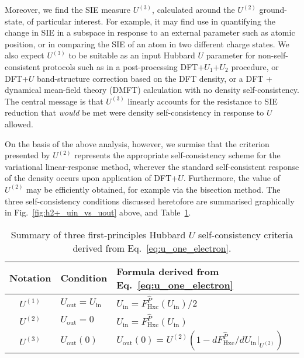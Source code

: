 Moreover, 
we find the SIE measure $U^{(3)}$, 
calculated around the $U^{(2)}$ ground-state, 
of particular interest.
%
For example, 
it may find use in quantifying the change in SIE 
in a subspace in response to an
external parameter such as atomic position, 
or in comparing the SIE of an atom in two different charge states.
%
We also expect $U^{(3)}$ to be suitable as
an input Hubbard $U$ parameter
for non-self-consistent protocols such as 
in a post-processing 
DFT+$U_1$+$U_2$ procedure, 
or DFT+$U$ band-structure correction based on the DFT density, 
or a DFT + dynamical mean-field theory (DMFT) calculation
with no density self-consistency. 
%
The central message is that 
$U^{(3)}$ linearly accounts
for the resistance to SIE reduction that {\it would} be met
were density self-consistency in response to $U$ allowed.

On the basis of the above analysis, however, 
we surmise that the criterion presented by $U^{(2)}$ 
represents the appropriate self-consistency scheme 
for the variational linear-response method, 
wherever the standard self-consistent response of the
density occurs upon application of DFT+$U$.
%
Furthermore, 
the value of $U^{(2)}$ may be efficiently obtained, 
for example via the bisection method.
%
The three self-consistency conditions 
discussed heretofore are summarised 
graphically in 
Fig.~\ref{fig:h2+_uin_vs_uout} above,  and 
Table~\ref{table:self_consistent_conditions}.

\begin{table}[th!]
\begin{tabular*}{\columnwidth}{@{\extracolsep{\fill}}cll}
\hline\hline
Notation & 	Condition 		& Formula derived from Eq.~\ref{eq:u_one_electron}\\
\hline
$U^{(1)}$	&\;$U_\textrm{out}=U_\textrm{in}$ & \;$U_\textrm{in}= F^{\hat{P}}_\textrm{Hxc}(U_\textrm{in})/2$\\[0.5em]
$U^{(2)}$	&\;$U_\textrm{out}=0$	& \;$U_\textrm{in}= F^{\hat{P}}_\textrm{Hxc}(U_\textrm{in})$\\[0.5em]
$U^{(3)}$	&\;$U_\textrm{out}(0)$	& \;$U_\textrm{out}(0)=U^{(2)}(1-d F^{\hat{P}}_\textrm{Hxc}/dU_\textrm{in}|_{U^{(2)}})$\\
\hline\hline
\end{tabular*}
\caption{Summary of  three first-principles Hubbard $U$ self-consistency criteria derived from Eq.~\ref{eq:u_one_electron}.}
\label{table:self_consistent_conditions}
\end{table}


